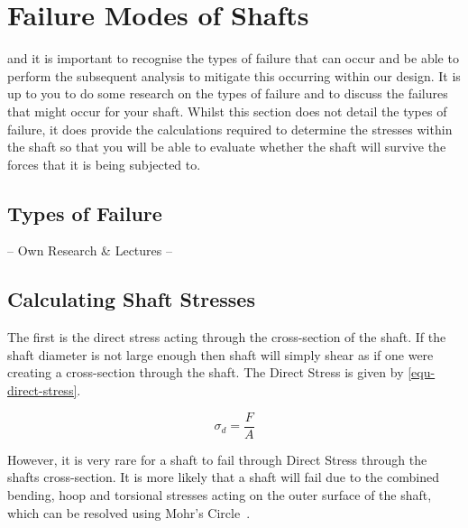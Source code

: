 \section{Failure Modes of Shafts}

 and it is important to recognise the types of failure that can occur and be able to perform the subsequent analysis to mitigate this occurring within our design. It is up to you to do some research on the types of failure and to discuss the failures that might occur for your shaft. Whilst this section does not detail the types of failure, it does provide the calculations required to determine the stresses within the shaft so that you will be able to evaluate whether the shaft will survive the forces that it is being subjected to.

\subsection{Types of Failure}

\begin{framed}
    \vspace{1cm}
    \begin{center}
        \Large
        -- Own Research \& Lectures --
    \end{center}
    \vspace{1cm}
\end{framed}

\subsection{Calculating Shaft Stresses}

 The first is the direct stress acting through the cross-section of the shaft.
If the shaft diameter is not large enough then shaft will simply shear as if one were creating a cross-section through the shaft.
The Direct Stress is given by \cref{equ-direct-stress}.

\begin{equation}
    \sigma_d = \frac{F}{A}
    \label{equ-direct-stress}
\end{equation}

However, it is very rare for a shaft to fail through Direct Stress through the shafts cross-section. It is more likely that a shaft will fail due to the combined bending, hoop and torsional stresses acting on the outer surface of the shaft, which can be resolved using Mohr's Circle~\cite{clifford2012}.

